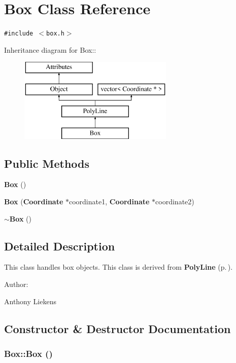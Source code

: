 \section{Box Class Reference}
\label{classBox}
{\tt \#include $<$box.h$>$}

Inheritance diagram for Box::\begin{figure}[H]
\begin{center}
\leavevmode
\includegraphics[height=4cm]{classBox}
\end{center}
\end{figure}
\subsection*{Public Methods}
\begin{CompactItemize}
\item 
{\bf Box} ()
\item 
{\bf Box} ({\bf Coordinate} $\ast$coordinate1, {\bf Coordinate} $\ast$coordinate2)
\item 
{\bf $\sim$Box} ()
\end{CompactItemize}


\subsection{Detailed Description}
This class handles box objects. This class is derived from {\bf Poly\-Line} {\rm (p.\,\pageref{classPolyLine})}. \begin{Desc}
\item[Author: ]\par
Anthony Liekens \end{Desc}




\subsection{Constructor \& Destructor Documentation}
\subsubsection{\setlength{\rightskip}{0pt plus 5cm}Box::Box ()}\label{classBox_a0}


